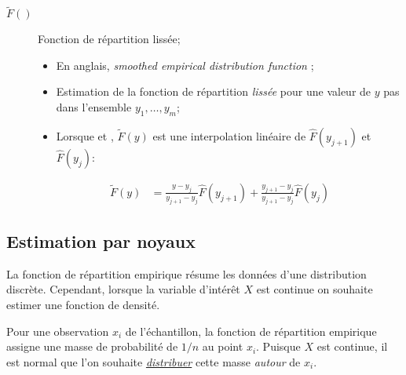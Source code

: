 \documentclass[10pt, french]{article}
\begin{document}
\begin{multicols*}{2}
\begin{distributions}[Notation]
\begin{description}
	\item[$\tilde{F}()$]	Fonction de répartition lissée;
		\begin{itemize}[leftmargin = *]
		\item	En anglais, \og \textit{smoothed empirical distribution function} \fg{};
		\item	Estimation de la fonction de répartition \textit{lissée} pour une valeur de $y$ pas dans l'ensemble $y_{1}, \dots, y_{m}$;
		\item	Lorsque  et , $\tilde{F}(y)$ est une interpolation linéaire de $\hat{F}(y_{j + 1})$ et $\hat{F}(y_{j})$:
		\end{itemize}
		\begin{align*}
		\tilde{F}(y)
		&=	\frac{y	-	y_{j	}}{y_{j + 1}	-	y_{j}}\hat{F}(y_{j + 1})  + 
				\frac{y_{j + 1}	-	y_{j	}}{y_{j + 1}	-	y_{j}}\hat{F}(y_{j})
		\end{align*}
\end{description}
\end{distributions}

\columnbreak
\subsection{Estimation par noyaux}

La fonction de répartition empirique résume les données d'une distribution discrète. Cependant, lorsque la variable d'intérêt $X$ est continue on souhaite estimer une fonction de densité.

Pour une observation $x_{i}$ de l'échantillon, la fonction de répartition empirique assigne une masse de probabilité de $1/n$ au point $x_{i}$.
Puisque $X$ est continue, il est normal que l'on souhaite \underline{\textit{distribuer}} cette masse \textit{autour} de $x_{i}$.


\end{multicols*}
\end{document}
